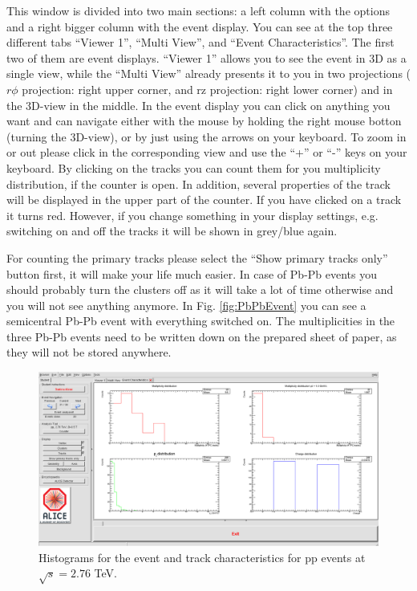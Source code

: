 \documentclass{article}
\begin{document}
This window is divided into two main sections: a left column with the options 
and a right bigger column with the event display. You can see at the top three
different tabs ``Viewer 1'', ``Multi View'', and ``Event Characteristics''.
The first two of them are event displays. ``Viewer 1'' allows you to see the 
event in 3D as a single view, while the ``Multi View'' already presents it to 
you in two projections ($r\phi$ projection: right upper corner, and 
rz projection: right lower corner) and in the 3D-view in the middle.	
In the event display you can click on anything you want and can navigate 
either with the mouse by holding the right mouse botton (turning the 3D-view), 
or by just using the arrows on your keyboard. To zoom in or out please click in
the corresponding view and use the ``+'' or ``-'' keys on your keyboard. By 
clicking on the tracks you can count them for you multiplicity distribution, 
if the counter is open. In addition, several properties of the track will be 
displayed in the upper part of the counter. If you have clicked on a track it 
turns red. However, if you change something in your display settings, e.g. 
switching on and off the tracks it will be shown in grey/blue again.

For counting the primary tracks please select the ``Show primary tracks only''
button first, it will make your life much easier. In case of Pb-Pb events you 
should probably turn the clusters off as it will take a lot of time otherwise 
and you will not see anything anymore. In Fig. \ref{fig:PbPbEvent} you can see 
a semicentral Pb-Pb event with everything switched on. The multiplicities in 
the three Pb-Pb events need to be written down on the prepared sheet of paper, 
as they will not be stored anywhere.

\begin{figure}
  \centering 
  \includegraphics[width=\textwidth]{HistogramsEventChar.png}
  \caption{Histograms for the event and track characteristics for pp events at 
    $\sqrt{s} = 2.76$ TeV.}
  \label{fig:EventHistos}
\end{figure}
\end{document}
